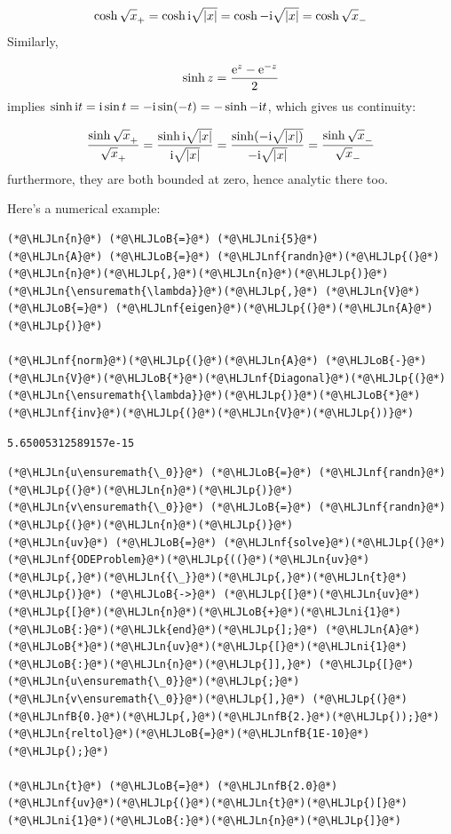 \documentclass[12pt,a4paper]{article}
\newcommand{\HLJLk}[1]{\textcolor[RGB]{148,91,176}{\textbf{#1}}}
\newcommand{\HLJLn}[1]{#1}
\newcommand{\HLJLnf}[1]{\textcolor[RGB]{66,102,213}{#1}}
\newcommand{\HLJLnfB}[1]{\textcolor[RGB]{59,151,46}{#1}}
\newcommand{\HLJLni}[1]{\textcolor[RGB]{59,151,46}{#1}}
\newcommand{\HLJLoB}[1]{\textcolor[RGB]{102,102,102}{\textbf{#1}}}
\newcommand{\HLJLp}[1]{#1}
\def\I{ {\rm i} }
\def\E{ {\rm e} }
\begin{document}
\[
\cosh \sqrt{x}_+ = \cosh \I \sqrt{|x|} = \cosh -\I \sqrt{|x|} = \cosh\sqrt{x}_-
\]
Similarly, 

\[
\sinh z = {\E^z - \E^{-z} \over 2}
\]
implies $\sinh{\I t} = \I \sin t = - \I \sin(-t) = -\sinh{-\I t}$, which gives us continuity:

\[
{\sinh \sqrt{x}_+ \over \sqrt{x}_+} = {\sinh \I \sqrt{|x|} \over \I \sqrt{|x|}} = {\sinh(-\I \sqrt{|x|)} \over -\I \sqrt{|x|}} ={\sinh \sqrt{x}_- \over \sqrt{x}_-}
\]
furthermore, they are both bounded at zero, hence analytic there too.

Here's a numerical example:


\begin{lstlisting}
(*@\HLJLn{n}@*) (*@\HLJLoB{=}@*) (*@\HLJLni{5}@*)
(*@\HLJLn{A}@*) (*@\HLJLoB{=}@*) (*@\HLJLnf{randn}@*)(*@\HLJLp{(}@*)(*@\HLJLn{n}@*)(*@\HLJLp{,}@*)(*@\HLJLn{n}@*)(*@\HLJLp{)}@*) 
(*@\HLJLn{\ensuremath{\lambda}}@*)(*@\HLJLp{,}@*) (*@\HLJLn{V}@*) (*@\HLJLoB{=}@*) (*@\HLJLnf{eigen}@*)(*@\HLJLp{(}@*)(*@\HLJLn{A}@*)(*@\HLJLp{)}@*)

(*@\HLJLnf{norm}@*)(*@\HLJLp{(}@*)(*@\HLJLn{A}@*) (*@\HLJLoB{-}@*) (*@\HLJLn{V}@*)(*@\HLJLoB{*}@*)(*@\HLJLnf{Diagonal}@*)(*@\HLJLp{(}@*)(*@\HLJLn{\ensuremath{\lambda}}@*)(*@\HLJLp{)}@*)(*@\HLJLoB{*}@*)(*@\HLJLnf{inv}@*)(*@\HLJLp{(}@*)(*@\HLJLn{V}@*)(*@\HLJLp{))}@*)
\end{lstlisting}

\begin{lstlisting}
5.65005312589157e-15
\end{lstlisting}


\begin{lstlisting}
(*@\HLJLn{u\ensuremath{\_0}}@*) (*@\HLJLoB{=}@*) (*@\HLJLnf{randn}@*)(*@\HLJLp{(}@*)(*@\HLJLn{n}@*)(*@\HLJLp{)}@*)
(*@\HLJLn{v\ensuremath{\_0}}@*) (*@\HLJLoB{=}@*) (*@\HLJLnf{randn}@*)(*@\HLJLp{(}@*)(*@\HLJLn{n}@*)(*@\HLJLp{)}@*)
(*@\HLJLn{uv}@*) (*@\HLJLoB{=}@*) (*@\HLJLnf{solve}@*)(*@\HLJLp{(}@*)(*@\HLJLnf{ODEProblem}@*)(*@\HLJLp{((}@*)(*@\HLJLn{uv}@*)(*@\HLJLp{,}@*)(*@\HLJLn{{\_}}@*)(*@\HLJLp{,}@*)(*@\HLJLn{t}@*)(*@\HLJLp{)}@*) (*@\HLJLoB{->}@*) (*@\HLJLp{[}@*)(*@\HLJLn{uv}@*)(*@\HLJLp{[}@*)(*@\HLJLn{n}@*)(*@\HLJLoB{+}@*)(*@\HLJLni{1}@*)(*@\HLJLoB{:}@*)(*@\HLJLk{end}@*)(*@\HLJLp{];}@*) (*@\HLJLn{A}@*)(*@\HLJLoB{*}@*)(*@\HLJLn{uv}@*)(*@\HLJLp{[}@*)(*@\HLJLni{1}@*)(*@\HLJLoB{:}@*)(*@\HLJLn{n}@*)(*@\HLJLp{]],}@*) (*@\HLJLp{[}@*)(*@\HLJLn{u\ensuremath{\_0}}@*)(*@\HLJLp{;}@*) (*@\HLJLn{v\ensuremath{\_0}}@*)(*@\HLJLp{],}@*) (*@\HLJLp{(}@*)(*@\HLJLnfB{0.}@*)(*@\HLJLp{,}@*)(*@\HLJLnfB{2.}@*)(*@\HLJLp{));}@*) (*@\HLJLn{reltol}@*)(*@\HLJLoB{=}@*)(*@\HLJLnfB{1E-10}@*)(*@\HLJLp{);}@*)

(*@\HLJLn{t}@*) (*@\HLJLoB{=}@*) (*@\HLJLnfB{2.0}@*)
(*@\HLJLnf{uv}@*)(*@\HLJLp{(}@*)(*@\HLJLn{t}@*)(*@\HLJLp{)[}@*)(*@\HLJLni{1}@*)(*@\HLJLoB{:}@*)(*@\HLJLn{n}@*)(*@\HLJLp{]}@*)
\end{lstlisting}
\end{document}
